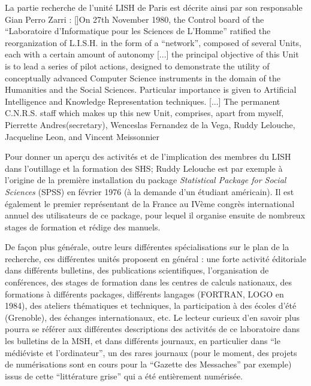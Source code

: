 La partie recherche de l'unité LISH de Paris est décrite ainsi par son responsable Gian Perro Zarri : [\cite{Zarri1981}]{On 27th November 1980, the Control board of the \enquote{Laboratoire d'Informatique pour les Sciences de L'Homme} ratified the reorganization of L.I.S.H. in the form of a \enquote{network}, composed of several Units, each with a certain amount of autonomy [...] the principal objective of this Unit is to lead a series of pilot actions, designed to demonstrate the utility of conceptually advanced Computer Science instruments in the domain of the Humanities and the Social Sciences. Particular importance is given to Artificial Intelligence and Knowledge Representation techniques. [...]  The permanent C.N.R.S. staff which makes up this new Unit, comprises, apart from myself, Pierrette Andres(secretary), Wenceslas Fernandez de la Vega, Ruddy Lelouche, Jacqueline Leon, and Vincent Meissonnier}

Pour donner un aperçu des activités et de l'implication des membres du LISH dans l'outillage et la formation des SHS; Ruddy Lelouche est par exemple à l'origine de la première installation du package \textit{Statistical Package for Social Sciences} (SPSS) en février 1976 (à la demande d'un étudiant américain). Il est également le premier représentant de la France au IVème congrès international annuel des utilisateurs de ce package, pour lequel il organise ensuite de nombreux stages de formation et rédige des manuels.

De façon plus générale, outre leurs différentes spécialisations sur le plan de la recherche, ces différentes unités proposent en général : une forte activité éditoriale dans différents bulletins, des publications scientifiques, l'organisation de conférences, des stages de formation dans les centres de calculs nationaux, des formations à différents packages, différents langages (FORTRAN, LOGO en 1984), des ateliers thématiques et techniques, la participation à des écoles d'été (Grenoble), des échanges internationaux, etc. Le lecteur curieux d'en savoir plus pourra se référer aux différentes descriptions des activités de ce laboratoire dans les bulletins de la MSH, et dans différents journaux, en particulier dans \enquote{le médiéviste et l'ordinateur}, un des rares journaux (pour le moment, des projets de numérisations sont en cours pour la \enquote{Gazette des Messaches} par exemple) issus de cette \enquote{littérature grise} qui a été entièrement numérisée.

